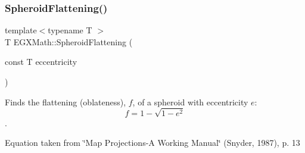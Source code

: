 \subsubsection{\texorpdfstring{Spheroid\+Flattening()}{SpheroidFlattening()}\hspace{0.1cm}{\footnotesize\ttfamily [2/2]}}
{\footnotesize\ttfamily template$<$typename T $>$ \\
T E\+G\+X\+Math\+::\+Spheroid\+Flattening (\begin{DoxyParamCaption}\item[{const T}]{eccentricity }\end{DoxyParamCaption})}



Finds the flattening (oblateness), $f$, of a spheroid with eccentricity $e$\+: \[ f = 1 - \sqrt{1-e^2} \]. 

Equation taken from \char`\"{}\+Map Projections-\/\+A Working Manual\char`\"{} (Snyder, 1987), p. 13

